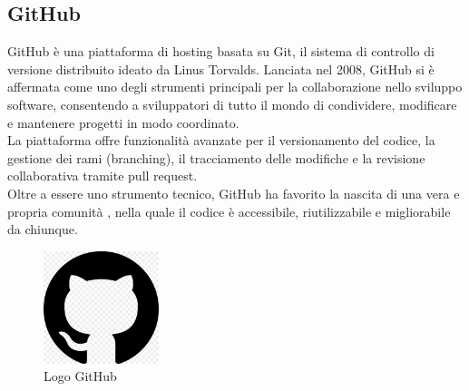 \subsection{GitHub}
\noindent GitHub è una piattaforma di hosting basata su Git, il sistema di controllo di versione distribuito ideato da Linus Torvalds. Lanciata nel 2008, GitHub si è affermata come uno degli strumenti principali per la collaborazione nello sviluppo software, consentendo a sviluppatori di tutto il mondo di condividere, modificare e mantenere progetti in modo coordinato. \\La piattaforma offre funzionalità avanzate per il versionamento del codice, la gestione dei rami (branching), il tracciamento delle modifiche e la revisione collaborativa tramite pull request. \\Oltre a essere uno strumento tecnico, GitHub ha favorito la nascita di una vera e propria comunità , nella quale il codice è accessibile, riutilizzabile e migliorabile da chiunque.
\begin{figure}[H]
    \centering
    \includegraphics[width=0.3\textwidth]{img/github.jpg}
    \caption[Logo GitHub]{Logo GitHub}
\end{figure}

